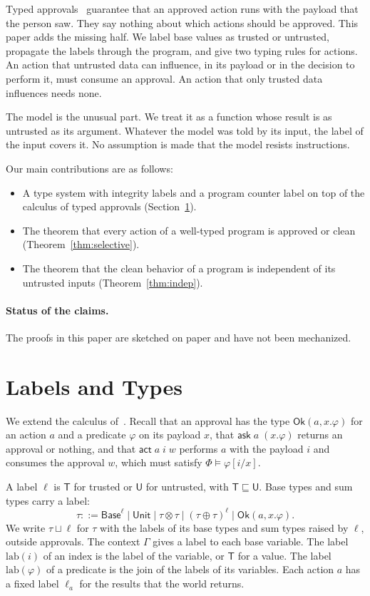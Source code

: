 \documentclass[acmsmall,nonacm,screen]{acmart}
\newcommand{\kw}[1]{\mathsf{#1}}
\newcommand{\Ok}[2]{\kw{Ok}(#1, #2)}
\newcommand{\ask}[2]{\kw{ask}\;#1\;(#2)}
\newcommand{\act}[3]{\kw{act}\;#1\;#2\;#3}
\newcommand{\Base}{\kw{Base}}
\newcommand{\T}{\kw{T}}
\newcommand{\U}{\kw{U}}
\newcommand{\lab}{\mathrm{lab}}
\begin{document}
Typed approvals~\citep{tpp4} guarantee that an approved action runs with the payload that the
person saw. They say nothing about which actions should be approved. This paper adds the
missing half. We label base values as trusted or untrusted, propagate the labels through the
program, and give two typing rules for actions. An action that untrusted data can influence, in
its payload or in the decision to perform it, must consume an approval. An action that only
trusted data influences needs none.

The model is the unusual part. We treat it as a function whose result is as untrusted as its
argument. Whatever the model was told by its input, the label of the input covers it. No
assumption is made that the model resists instructions.

Our main contributions are as follows:
\begin{itemize}
\item A type system with integrity labels and a program counter label on top of the calculus of
  typed approvals (Section~\ref{sec:types}).
\item The theorem that every action of a well-typed program is approved or clean
  (Theorem~\ref{thm:selective}).
\item The theorem that the clean behavior of a program is independent of its untrusted inputs
  (Theorem~\ref{thm:indep}).
\end{itemize}

\paragraph{Status of the claims.}
The proofs in this paper are sketched on paper and have not been mechanized.

\section{Labels and Types}
\label{sec:types}

We extend the calculus of~\citet{tpp4}. Recall that an approval has the type
$\Ok{a}{x.\varphi}$ for an action $a$ and a predicate $\varphi$ on its payload $x$, that
$\ask{a}{x.\varphi}$ returns an approval or nothing, and that $\act{a}{i}{w}$ performs $a$ with
the payload $i$ and consumes the approval $w$, which must satisfy $\Phi \models \varphi[i/x]$.

A label $\ell$ is $\T$ for trusted or $\U$ for untrusted, with $\T \sqsubseteq \U$. Base types
and sum types carry a label:
\[
\tau ::= \Base^\ell \mid \kw{Unit} \mid \tau \otimes \tau \mid (\tau \oplus \tau)^\ell \mid
  \Ok{a}{x.\varphi} .
\]
We write $\tau \sqcup \ell$ for $\tau$ with the labels of its base types and sum types raised by
$\ell$, outside approvals. The context $\Gamma$ gives a label to each base variable. The label
$\lab(i)$ of an index is the label of the variable, or $\T$ for a value. The label
$\lab(\varphi)$ of a predicate is the join of the labels of its variables. Each action $a$ has a
fixed label $\ell_a$ for the results that the world returns.
\end{document}

